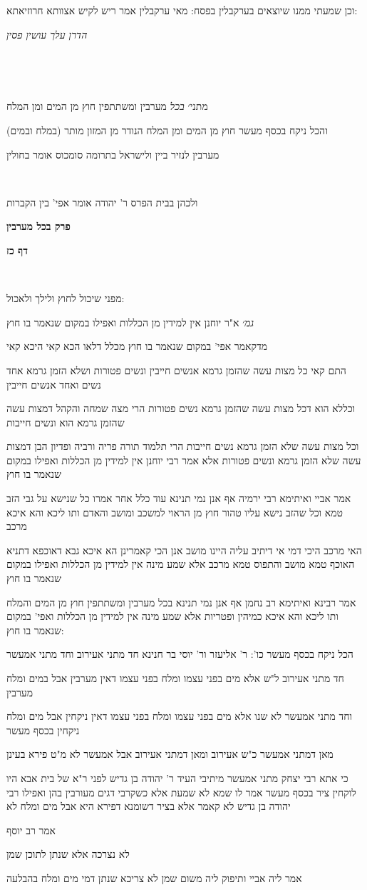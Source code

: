 \documentclass[12pt, openany]{book}
\newcommand{\sethebfont}{
\fontsize{10.5pt}{21.0pt} \selectfont
}
\newcommand{\textblock}[1]{
{\sethebfont #1\\}	
}
\newcommand{\chapname}{}
\newcommand{\sectname}{}
\newcommand{\newchap}[1]{
	\addcontentsline{toc}{chapter}{#1}
	\renewcommand{\chapname}{#1}
		\begin{center}
			\textbf{%
\fontsize{16pt}{16pt}\selectfont
				#1}
		\end{center}
}
\newcommand{\newsection}[1]{
	\addcontentsline{toc}{section}{#1}
	\renewcommand{\sectname}{#1}	
	\vspace{-\baselineskip}
	\begin{center}
		\textbf{%
\fontsize{16pt}{16pt}\selectfont
			#1}
	\end{center}
	\vspace{-\baselineskip}
	\nopagebreak
}
\begin{document}
\textblock{וכן שמעתי ממנו שיוצאים בערקבלין בפסח: מאי ערקבלין אמר ריש לקיש אצוותא חרוזיאתא:}
\textblock{\par \par {\large\emph{הדרן עלך עושין פסין}}\par \par }
\textblock{}
\textblock{מתני׳ {\large\emph{בכל}} מערבין ומשתתפין חוץ מן המים ומן המלח}
\textblock{והכל ניקח בכסף מעשר חוץ מן המים ומן המלח הנודר מן המזון מותר (במלח ובמים)}
\textblock{מערבין לנזיר ביין ולישראל בתרומה סומכוס אומר בחולין}
\textblock{}
\textblock{ולכהן בבית הפרס ר' יהודה אומר אפי' בין הקברות}
\newchap{פרק \quad בכל מערבין}
\newsection{דף כז}
\textblock{}
\textblock{מפני שיכול לחוץ ולילך ולאכול:}
\textblock{{\large\emph{גמ׳}} א"ר יוחנן אין למידין מן הכללות ואפילו במקום שנאמר בו חוץ}
\textblock{מדקאמר אפי' במקום שנאמר בו חוץ מכלל דלאו הכא קאי היכא קאי}
\textblock{התם קאי כל מצות עשה שהזמן גרמא אנשים חייבין ונשים פטורות ושלא הזמן גרמא אחד נשים ואחד אנשים חייבין}
\textblock{וכללא הוא דכל מצות עשה שהזמן גרמא נשים פטורות הרי מצה שמחה והקהל דמצות עשה שהזמן גרמא הוא ונשים חייבות}
\textblock{וכל מצות עשה שלא הזמן גרמא נשים חייבות הרי תלמוד תורה פריה ורביה ופדיון הבן דמצות עשה שלא הזמן גרמא ונשים פטורות אלא אמר רבי יוחנן אין למידין מן הכללות ואפילו במקום שנאמר בו חוץ}
\textblock{אמר אביי ואיתימא רבי ירמיה אף אנן נמי תנינא עוד כלל אחר אמרו כל שנישא על גבי הזב טמא וכל שהזב נישא עליו טהור חוץ מן הראוי למשכב ומושב והאדם ותו ליכא והא איכא מרכב}
\textblock{האי מרכב היכי דמי אי דיתיב עליה היינו מושב אנן הכי קאמרינן הא איכא גבא דאוכפא דתניא האוכף טמא מושב והתפוס טמא מרכב אלא שמע מינה אין למידין מן הכללות ואפילו במקום שנאמר בו חוץ}
\textblock{אמר רבינא ואיתימא רב נחמן אף אנן נמי תנינא בכל מערבין ומשתתפין חוץ מן המים והמלח ותו ליכא והא איכא כמיהין ופטריות אלא שמע מינה אין למידין מן הכללות ואפי' במקום שנאמר בו חוץ:}
\textblock{הכל ניקח בכסף מעשר כו': ר' אליעזר ור' יוסי בר חנינא חד מתני אעירוב וחד מתני אמעשר}
\textblock{חד מתני אעירוב ל"ש אלא מים בפני עצמו ומלח בפני עצמו דאין מערבין אבל במים ומלח מערבין}
\textblock{וחד מתני אמעשר לא שנו אלא מים בפני עצמו ומלח בפני עצמו דאין ניקחין אבל מים ומלח ניקחין בכסף מעשר}
\textblock{מאן דמתני אמעשר כ"ש אעירוב ומאן דמתני אעירוב אבל אמעשר לא מ"ט פירא בעינן}
\textblock{כי אתא רבי יצחק מתני אמעשר מיתיבי העיד ר' יהודה בן גדיש לפני ר"א של בית אבא היו לוקחין ציר בכסף מעשר אמר לו שמא לא שמעת אלא כשקרבי דגים מעורבין בהן ואפילו רבי יהודה בן גדיש לא קאמר אלא בציר דשומנא דפירא היא אבל מים ומלח לא}
\textblock{אמר רב יוסף}
\textblock{לא נצרכה אלא שנתן לתוכן שמן}
\textblock{אמר ליה אביי ותיפוק ליה משום שמן לא צריכא שנתן דמי מים ומלח בהבלעה}
\end{document}
